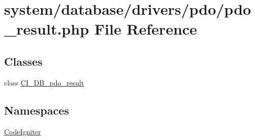 \hypertarget{pdo__result_8php}{}\section{system/database/drivers/pdo/pdo\+\_\+result.php File Reference}
\label{pdo__result_8php}
\subsection*{Classes}
\begin{DoxyCompactItemize}
\item 
class \mbox{\hyperlink{class_c_i___d_b__pdo__result}{C\+I\+\_\+\+D\+B\+\_\+pdo\+\_\+result}}
\end{DoxyCompactItemize}
\subsection*{Namespaces}
\begin{DoxyCompactItemize}
\item 
 \mbox{\hyperlink{namespace_code_igniter}{Code\+Igniter}}
\end{DoxyCompactItemize}
